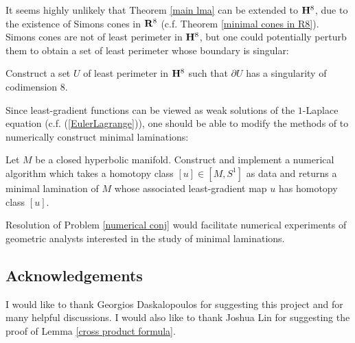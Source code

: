 It seems highly unlikely that Theorem \ref{main lma} can be extended to $\mathbf H^8$, due to the existence of Simons cones in $\mathbf{R}^8$ (c.f. Theorem \ref{minimal cones in R8}).
Simons cones are not of least perimeter in $\mathbf H^8$, but one could potentially perturb them to obtain a set of least perimeter whose boundary is singular:

\begin{problem}
    Construct a set $U$ of least perimeter in $\mathbf H^8$ such that $\partial U$ has a singularity of codimension $8$.
\end{problem}

Since least-gradient functions can be viewed as weak solutions of the $1$-Laplace equation (c.f. (\ref{EulerLagrange})), one should be able to modify the methods of \cite{Loisel20} to numerically construct minimal laminations:

\begin{problem}\label{numerical conj}
    Let $M$ be a closed hyperbolic manifold.
    Construct and implement a numerical algorithm which takes a homotopy class $[u] \in [M, S^1]$ as data and returns a minimal lamination of $M$ whose associated least-gradient map $u$ has homotopy class $[u]$.
\end{problem}

Resolution of Problem \ref{numerical conj} would facilitate numerical experiments of geometric analysts interested in the study of minimal laminations. 


\subsection{Acknowledgements}
I would like to thank Georgios Daskalopoulos for suggesting this project and for many helpful discussions.
I would also like to thank Joshua Lin for suggesting the proof of Lemma \ref{cross product formula}.
